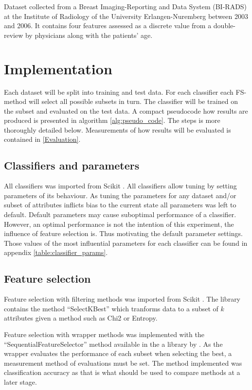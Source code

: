 Dataset collected from a Breast Imaging-Reporting and Data System (BI-RADS) at the Institute of Radiology of the University Erlangen-Nuremberg between 2003 and 2006. It contains four features assessed as a discrete value from a double-review by physicians along with the patients' age.


\section{Implementation}

Each dataset will be split into training and test data. For each classifier each FS-method will select all possible subsets in turn. The classifier will be trained on the subset and evaluated on the test data. A compact pseudocode how results are produced is presented in algorithm \ref{alg:pseudo_code}. The steps is more thoroughly detailed below. Measurements of how results will be evaluated is contained in \ref{Evaluation}.



\subsection{Classifiers and parameters}
All classifiers was imported from Scikit \parencite{scikit-learn}. All classifiers allow tuning by setting parameters of its behaviour. As tuning the parameters for any dataset and/or subset of attributes inflicts bias to the current state all parameters was left to default. Default parameters may cause suboptimal performance of a classifier. However, an optimal performance is not the intention of this experiment, the influence of feature selection is. Thus motivating the default parameter settings. Those values of the most influential parameters for each classifier can be found in appendix \ref{table:classifier_params}.


\subsection{Feature selection}

Feature selection with filtering methods was imported from  Scikit \parencite{scikit-learn}. The library contains the method ``SelectKBest'' which tranforms data to a subset of $k$ attributes given a method such as Chi2 or Entropy.

Feature selection with wrapper methods was implemented with the ``SequentialFeatureSelector'' method available in the a library by \textcite{mlextend}. As the wrapper evaluates the performance of each subset when selecting the best, a measurement method of evaluations must be set. The method implemented was classification accuracy as that is what should be used to compare methods at a later stage.


